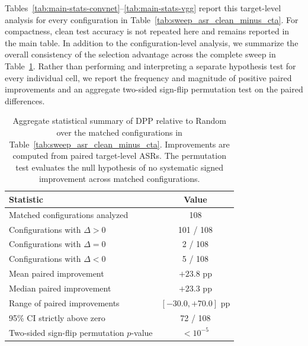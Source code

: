 Tables~\ref{tab:main-stats-convnet}--\ref{tab:main-stats-vgg} report
this target-level analysis for every configuration in
Table~\ref{tab:sweep_asr_clean_minus_cta}. For compactness, clean test
accuracy is not repeated here and remains reported in the main table.
In addition to the configuration-level analysis, we summarize the
overall consistency of the selection advantage across the complete
sweep in Table~\ref{tab:aggregate-statistics}. Rather than performing
and interpreting a separate hypothesis test for every individual cell,
we report the frequency and magnitude of positive paired improvements
and an aggregate two-sided sign-flip permutation test on the paired
differences.



\begin{table}[t]
\centering
\caption{
Aggregate statistical summary of DPP relative to Random over the
matched configurations in Table~\ref{tab:sweep_asr_clean_minus_cta}.
Improvements are computed from paired target-level ASRs. The permutation
test evaluates the null hypothesis of no systematic signed improvement
across matched configurations.
}
\label{tab:aggregate-statistics}
\small
\setlength{\tabcolsep}{9pt}
\renewcommand{\arraystretch}{1.10}
\begin{tabular}{lc}
\toprule
\textbf{Statistic} & \textbf{Value} \\
\midrule
Matched configurations analyzed
    & 108 \\
Configurations with $\Delta>0$
    & 101 / 108 \\
Configurations with $\Delta=0$
    & 2 / 108 \\
Configurations with $\Delta<0$
    & 5 / 108 \\
Mean paired improvement
    & $+23.8$ pp \\
Median paired improvement
    & $+23.3$ pp \\
Range of paired improvements
    & $[-30.0, +70.0]$ pp \\
95\% CI strictly above zero
    & 72 / 108 \\
Two-sided sign-flip permutation $p$-value
    & $<10^{-5}$ \\
\bottomrule
\end{tabular}
\end{table}



